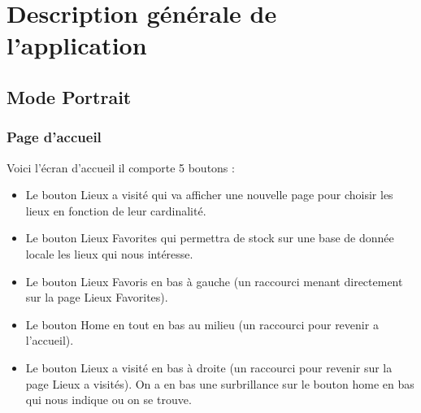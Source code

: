 \documentclass{article}
\begin{document}
{\color{brown}\section{Description générale de l'application}}
\label{section:description}

{\color{olive}\subsection{Mode Portrait}}
\begin{minipage}{0.5\textwidth}
\subsubsection{\color{purple}Page d'accueil}
Voici l'écran d'accueil il comporte 5 boutons :
\begin{itemize}
 \item Le bouton Lieux a visité qui va afficher une nouvelle page pour choisir les lieux en fonction de leur cardinalité.
\item Le bouton Lieux Favorites qui permettra de stock sur une base de donnée locale les lieux qui nous intéresse.
\item Le bouton Lieux Favoris en bas à gauche (un raccourci menant directement sur la page Lieux Favorites).
\item Le bouton Home en tout en bas au milieu (un raccourci pour revenir a l'accueil).
\item Le bouton Lieux a visité en bas à droite (un raccourci pour revenir sur la page Lieux a visités).
\newline On a en bas une surbrillance sur le bouton home en bas qui nous indique ou on se trouve.  
\end{itemize}
\end{minipage}
\hfill
\end{document}
